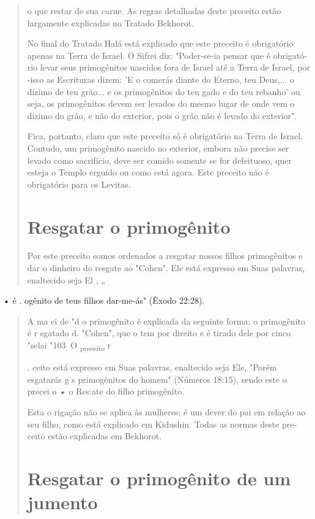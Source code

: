 \begin{quote}


o que restar de sua carne. As regras detalhadas deste preceito estão
largamente explicadas no Tratado Bekhorot.

No final do Tratado Halá está explicado que este preceito é obriga­tório
apenas na Terra de Israel. O Sifrei diz: "Poder-se-ia pensar que é
obrigató­rio levar seus primogênitos nascidos fora de Israel até a Terra
de Israel, por -isso as Escrituras dizem: 'E o comerás diante do Eterno,
teu Deus,... o dízimo de teu grão... e os primogênitos do teu gado e do
teu rebanho' ou seja, os primo­gênitos devem ser levados do mesmo lugar
de onde vem o dízimo do grão, e não do exterior, pois o grão não é
levado do exterior".

Fica, portanto, claro que este preceito só é obrigatório na Terra de
Israel. Contudo, um primogênito nascido no exterior, embora não precise
ser levado como sacrifício, deve ser comido somente se for defeituoso,
quer esteja o Templo erguido ou como está agora. Este preceito não é
obrigatório para os Levitas.

\section{Resgatar o primogênito}

Por este preceito somos ordenados a resgatar nossos filhos primogê­nitos
e dar o dinheiro do resgate ao "Cohen". Ele está expresso em Suas
palavras, enaltecido seja El , „
\end{quote}

• é . ogênito de teus filhos dar-me-ás" (Êxodo 22:28).

\begin{quote}
A ma ei de "d o primogênito é explicada da seguinte forma: o primogênito
é r sgatado d. "Cohen", que o tem por direito e é tirado dele por cinco
"selai "103\textsubscript{.} O \textsubscript{preceito} r

. ceito está expresso em Suas palavras, enaltecido seja Ele, "Porém
esgatarás g s primogênitos do homem" (Números 18:15), sen­do este o
precei o • o Res:ate do filho primogênito.

Esta o rigação não se aplica às mulheres; é um dever do pai em rela­ção
ao seu filho, como está explicado em Kidushin. Todas as normas deste
pre­ceito estão explicadas em Bekhorot.

\section{Resgatar o primogênito de um jumento}
\end{quote}


